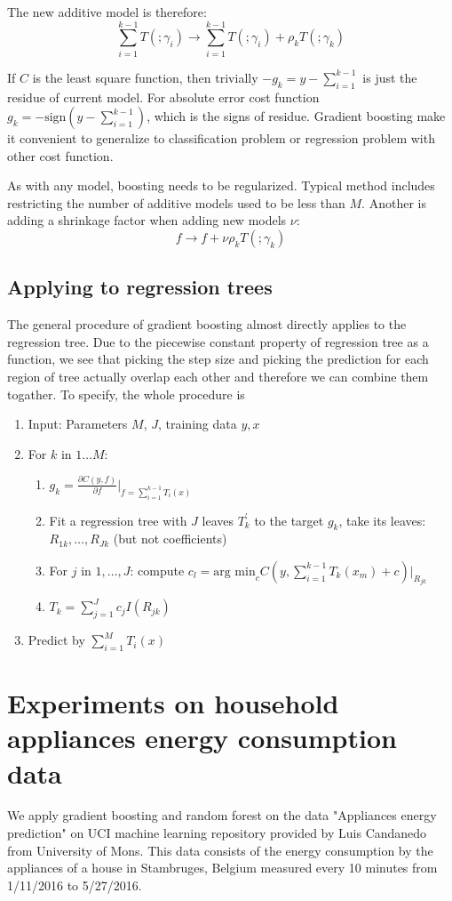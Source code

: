 \documentclass{article}
\begin{document}
The new additive model is therefore:
\[
\sum_{i=1}^{k-1}T(;\gamma_i)\rightarrow \sum_{i=1}^{k-1}T(;\gamma_i)+\rho_kT(;\gamma_k)
\]

If $C$ is the least square function, then trivially $-g_k=y-\sum_{i=1}^{k-1}$ is just the residue of current model. For absolute error cost function $g_k=-\textrm{sign}(y-\sum_{i=1}^{k-1})$, which is the signs of residue. Gradient boosting make it convenient to generalize to classification problem or regression problem with other cost function.

As with any model, boosting needs to be regularized. Typical method includes restricting the number of additive models used to be less than $M$. Another is adding a shrinkage factor when adding new models $\nu$:
\[
f\rightarrow f+\nu\rho_kT( ;\gamma_k)
\]
\subsection{Applying to regression trees}
The general procedure of gradient boosting almost directly applies to the regression tree. Due to the piecewise constant property of regression tree as a function, we see that picking the step size and picking the prediction for each region of tree actually overlap each other and therefore we can combine them togather. To specify, the whole procedure is
\begin{enumerate}
\item
Input: Parameters $M$, $J$, training data $y,x$
\item
For $k$ in $1\dots M$:
\begin{enumerate}
\item
$g_k=\frac{\partial C(y,f)}{\partial f}|_{f=\sum_{i=1}^{k-1}T_i(x)}$
\item
Fit a regression tree with $J$ leaves $T_k^\prime$ to the target $g_k$, take its leaves: $R_{1k},\dots, R_{Jk}$ (but not coefficients)
\item
For $j$ in $1,\dots,J$: compute $c_l=\textrm{arg min}_{c}C(y,\sum_{i=1}^{k-1}T_k(x_m)+c)|_{R_{jk}}$
\item
$T_k=\sum_{j=1}^Jc_jI(R_{jk})$
\end{enumerate}
\item
Predict by $\sum_{i=1}^MT_i(x)$
\end{enumerate}
\section{Experiments on household appliances energy consumption data}
We apply gradient boosting and random forest on the data "Appliances energy prediction" on UCI machine learning repository provided by Luis Candanedo from University of Mons. This data consists of the energy consumption by the appliances of a house in Stambruges, Belgium measured every 10 minutes from 1/11/2016 to 5/27/2016.
\end{document}
